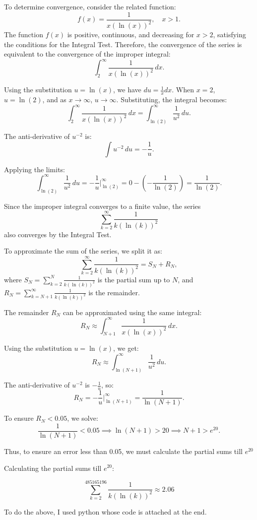 \documentclass[12pt]{article}
\begin{document}
\begin{enumerate}
\begin{enumerate}
To determine convergence, consider the related function:
\[
f(x) = \frac{1}{x (\ln(x))^2}, \quad x > 1.
\]
The function \(f(x)\) is positive, continuous, and decreasing for \(x > 2\), satisfying the conditions for the Integral Test. Therefore, the convergence of the series is equivalent to the convergence of the improper integral:
\[
\int_2^\infty \frac{1}{x (\ln(x))^2} \, dx.
\]

Using the substitution \( u = \ln(x) \), we have \( du = \frac{1}{x} dx \). When \(x = 2\), \(u = \ln(2)\), and as \(x \to \infty\), \(u \to \infty\). Substituting, the integral becomes:
\[
\int_2^\infty \frac{1}{x (\ln(x))^2} \, dx = \int_{\ln(2)}^\infty \frac{1}{u^2} \, du.
\]

The anti-derivative of \(u^{-2}\) is:
\[
\int u^{-2} \, du = -\frac{1}{u}.
\]

Applying the limits:
\[
\int_{\ln(2)}^\infty \frac{1}{u^2} \, du = -\frac{1}{u} \Big|_{\ln(2)}^\infty = 0 - \left(-\frac{1}{\ln(2)}\right) = \frac{1}{\ln(2)}.
\]

Since the improper integral converges to a finite value, the series 
\[
\sum_{k=2}^\infty \frac{1}{k (\ln(k))^2}
\]
also converges by the Integral Test.

To approximate the sum of the series, we split it as:
\[
\sum_{k=2}^\infty \frac{1}{k (\ln(k))^2} = S_N + R_N,
\]
where \(S_N = \sum_{k=2}^N \frac{1}{k (\ln(k))^2}\) is the partial sum up to \(N\), and \(R_N = \sum_{k=N+1}^\infty \frac{1}{k (\ln(k))^2}\) is the remainder.

The remainder \(R_N\) can be approximated using the same integral:
\[
R_N \approx \int_{N+1}^\infty \frac{1}{x (\ln(x))^2} \, dx.
\]

Using the substitution \(u = \ln(x)\), we get:
\[
R_N \approx \int_{\ln(N+1)}^\infty \frac{1}{u^2} \, du.
\]

The anti-derivative of \(u^{-2}\) is \(-\frac{1}{u}\), so:
\[
R_N = -\frac{1}{u} \Big|_{\ln(N+1)}^\infty = \frac{1}{\ln(N+1)}.
\]

To ensure \(R_N < 0.05\), we solve:
\[
\frac{1}{\ln(N+1)} < 0.05 \implies \ln(N+1) > 20 \implies N+1 > e^{20}.
\]

Thus, to ensure an error less than 0.05, we must calculate the partial sums till \(e^{20}\)

Calculating the partial sums till $e^{20}$:

\[
\sum_{k = 2}^{485165196} \frac{1}{k (\ln(k))^2} \approx 2.06
\]

To do the above, I used python whose code is attached at the end.


\end{enumerate}
\end{enumerate}
\end{document}
